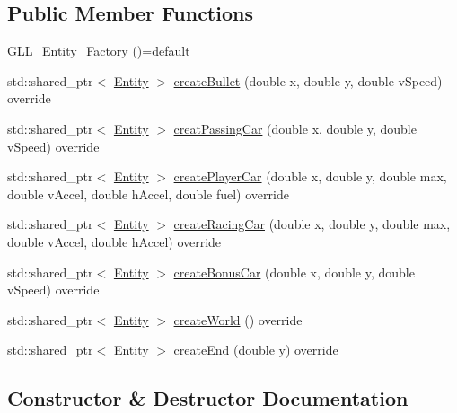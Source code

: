 \subsection*{Public Member Functions}
\begin{DoxyCompactItemize}
\item 
\hyperlink{classroadfighter_1_1GLL__Entity__Factory_ab9689b5c0b2eae42b1b5e3dc1dcc46e0}{G\+L\+L\+\_\+\+Entity\+\_\+\+Factory} ()=default
\item 
std\+::shared\+\_\+ptr$<$ \hyperlink{classroadfighter_1_1Entity}{Entity} $>$ \hyperlink{classroadfighter_1_1GLL__Entity__Factory_a7fcd57b8a2ae18240476f6dc64216822}{create\+Bullet} (double x, double y, double v\+Speed) override
\item 
std\+::shared\+\_\+ptr$<$ \hyperlink{classroadfighter_1_1Entity}{Entity} $>$ \hyperlink{classroadfighter_1_1GLL__Entity__Factory_aa176b2bec6007989c5cf3658840123c7}{creat\+Passing\+Car} (double x, double y, double v\+Speed) override
\item 
std\+::shared\+\_\+ptr$<$ \hyperlink{classroadfighter_1_1Entity}{Entity} $>$ \hyperlink{classroadfighter_1_1GLL__Entity__Factory_a45992523d105bd284b7aeed6cb41ce8a}{create\+Player\+Car} (double x, double y, double max, double v\+Accel, double h\+Accel, double fuel) override
\item 
std\+::shared\+\_\+ptr$<$ \hyperlink{classroadfighter_1_1Entity}{Entity} $>$ \hyperlink{classroadfighter_1_1GLL__Entity__Factory_a81737f6acc8d3c460b4d244cf06baeec}{create\+Racing\+Car} (double x, double y, double max, double v\+Accel, double h\+Accel) override
\item 
std\+::shared\+\_\+ptr$<$ \hyperlink{classroadfighter_1_1Entity}{Entity} $>$ \hyperlink{classroadfighter_1_1GLL__Entity__Factory_a2a6a8d397d43c48894adb6c9d9ed0947}{create\+Bonus\+Car} (double x, double y, double v\+Speed) override
\item 
std\+::shared\+\_\+ptr$<$ \hyperlink{classroadfighter_1_1Entity}{Entity} $>$ \hyperlink{classroadfighter_1_1GLL__Entity__Factory_a80f9f647f1192ddc098b2aa4f0172168}{create\+World} () override
\item 
std\+::shared\+\_\+ptr$<$ \hyperlink{classroadfighter_1_1Entity}{Entity} $>$ \hyperlink{classroadfighter_1_1GLL__Entity__Factory_ae26222829d8295cef0aa708a7ee909b7}{create\+End} (double y) override
\end{DoxyCompactItemize}


\subsection{Constructor \& Destructor Documentation}
\mbox{\label{classroadfighter_1_1GLL__Entity__Factory_ab9689b5c0b2eae42b1b5e3dc1dcc46e0}} 
